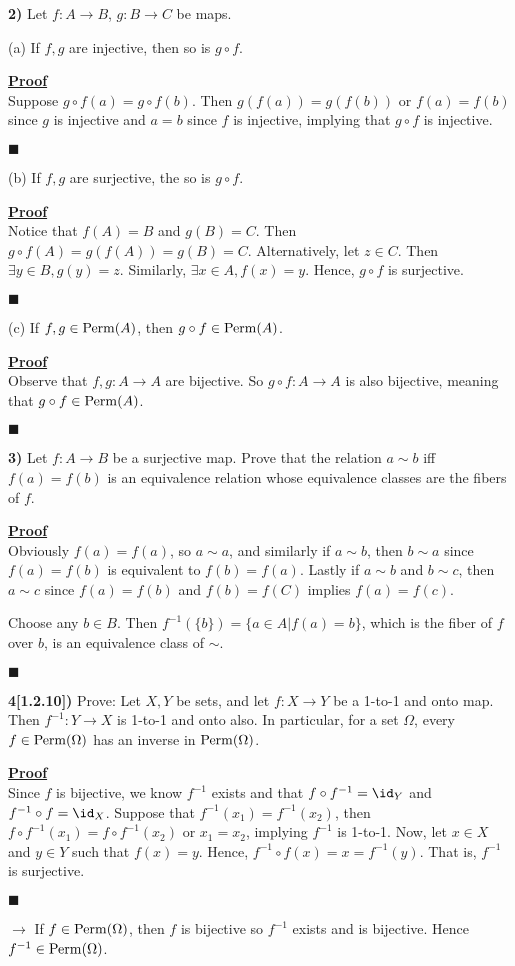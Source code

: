 \documentclass[12pt,a4paper]{article}
\newcommand{\prob}[2]{\textbf{#1)} #2}
\newenvironment{proof}
{
\textbf{\underline{Proof}} \\
}
{
\begin{flushright}
$\blacksquare$
\end{flushright}}
\begin{document}
\prob{2}{Let $f: A \rightarrow B$, $g: B \rightarrow C$ be maps.}

(a) If $f,g$ are injective, then so is $g \circ f$.

\begin{proof}
Suppose $g \circ f(a) = g \circ f(b)$. Then $g(f(a)) = g(f(b))$ or $f(a) = f(b)$ since $g$ is injective and $a = b$ since $f$ is injective, implying that $g \circ f$ is injective.
\end{proof}

(b) If $f,g$ are surjective, the so is $g \circ f$.

\begin{proof}
Notice that $f(A) = B$ and $g(B) = C$. Then $g \circ f(A) = g(f(A)) = g(B) = C$. Alternatively, let $z \in C$. Then $\exists y \in B, g(y) = z$. Similarly, $\exists x \in A, f(x) = y$. Hence, $g \circ f$ is surjective.
\end{proof}

(c) If $f,g \in {\rm Perm}(A)$, then $g \circ f \in {\rm Perm}(A)$.

\begin{proof}
Observe that $f,g: A \rightarrow A$ are bijective. So $g \circ f: A \rightarrow A$ is also bijective, meaning that $g \circ f \in {\rm Perm}(A)$.
\end{proof} 

\prob{3}{Let $f: A \rightarrow B$ be a surjective map. Prove that the relation $a \sim b$ iff $f(a) = f(b)$ is an equivalence relation whose equivalence classes are the fibers of $f$.}

\begin{proof}
Obviously $f(a) = f(a)$, so $a \sim a$, and similarly if $a \sim b$, then $b \sim a$ since $f(a) = f(b)$ is equivalent to $f(b) = f(a)$. Lastly if $a \sim b$ and $b \sim c$, then $a \sim c$ since $f(a) = f(b)$ and $f(b) = f(C)$ implies $f(a) = f(c)$.

Choose any $b \in B$. Then $f^{-1}(\{b\}) = \{a \in A | f(a) = b\}$, which is the fiber of $f$ over $b$, is an equivalence class of $\sim$.
\end{proof}

\prob{4[1.2.10]}{Prove: Let $X,Y$ be sets, and let $f: X \rightarrow Y$ be a 1-to-1 and onto map. Then $f^{-1}: Y \rightarrow X$ is 1-to-1 and onto also. In particular, for a set $\Omega$, every $f \in {\rm Perm}(\Omega)$ has an inverse in ${\rm Perm}(\Omega)$.}

\begin{proof}
Since $f$ is bijective, we know $f^{-1}$ exists and that $f \circ f^{-1} = \id_{Y}$ and $f^{-1} \circ f = \id_{X}$. Suppose that $f^{-1}(x_1) = f^{-1}(x_2)$, then $f \circ f^{-1}(x_1) = f \circ f^{-1}(x_2)$ or $x_1 = x_2$, implying $f^{-1}$ is 1-to-1. Now, let $x \in X$ and $y \in Y$ such that $f(x) = y$. Hence, $f^{-1} \circ f(x) = x = f^{-1}(y)$. That is, $f^{-1}$ is surjective.
\end{proof}
$\rightarrow$ If $f \in {\rm Perm}(\Omega)$, then $f$ is bijective so $f^{-1}$ exists and is bijective. Hence $f^{-1} \in {\rm Perm}(\Omega)$.
\end{document}
